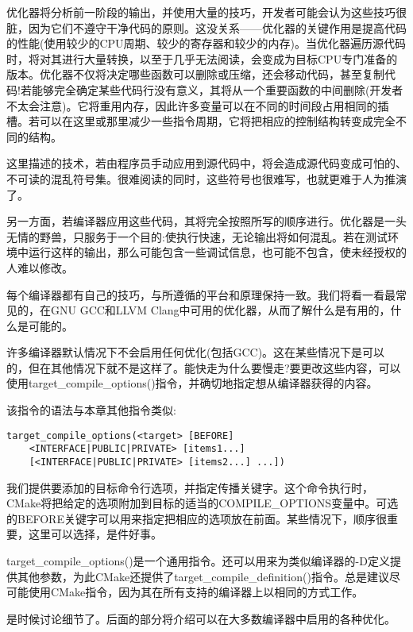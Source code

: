 
优化器将分析前一阶段的输出，并使用大量的技巧，开发者可能会认为这些技巧很脏，因为它们不遵守干净代码的原则。这没关系——优化器的关键作用是提高代码的性能(使用较少的CPU周期、较少的寄存器和较少的内存)。当优化器遍历源代码时，将对其进行大量转换，以至于几乎无法阅读，会变成为目标CPU专门准备的版本。优化器不仅将决定哪些函数可以删除或压缩，还会移动代码，甚至复制代码!若能够完全确定某些代码行没有意义，其将从一个重要函数的中间删除(开发者不太会注意)。它将重用内存，因此许多变量可以在不同的时间段占用相同的插槽。若可以在这里或那里减少一些指令周期，它将把相应的控制结构转变成完全不同的结构。

这里描述的技术，若由程序员手动应用到源代码中，将会造成源代码变成可怕的、不可读的混乱符号集。很难阅读的同时，这些符号也很难写，也就更难于人为推演了。

另一方面，若编译器应用这些代码，其将完全按照所写的顺序进行。优化器是一头无情的野兽，只服务于一个目的:使执行快速，无论输出将如何混乱。若在测试环境中运行这样的输出，那么可能包含一些调试信息，也可能不包含，使未经授权的人难以修改。

每个编译器都有自己的技巧，与所遵循的平台和原理保持一致。我们将看一看最常见的，在GNU GCC和LLVM Clang中可用的优化器，从而了解什么是有用的，什么是可能的。

许多编译器默认情况下不会启用任何优化(包括GCC)。这在某些情况下是可以的，但在其他情况下就不是这样了。能快走为什么要慢走?要更改这些内容，可以使用target\_compile\_options()指令，并确切地指定想从编译器获得的内容。

该指令的语法与本章其他指令类似:

\begin{lstlisting}[style=styleCMake]
target_compile_options(<target> [BEFORE]
	<INTERFACE|PUBLIC|PRIVATE> [items1...]
	[<INTERFACE|PUBLIC|PRIVATE> [items2...] ...])
\end{lstlisting}  

我们提供要添加的目标命令行选项，并指定传播关键字。这个命令执行时，CMake将把给定的选项附加到目标的适当的COMPILE\_OPTIONS变量中。可选的BEFORE关键字可以用来指定把相应的选项放在前面。某些情况下，顺序很重要，这里可以选择，是件好事。

\begin{tcolorbox}[colback=blue!5!white,colframe=blue!75!black,title=重要的Note]
target\_compile\_options()是一个通用指令。还可以用来为类似编译器的-D定义提供其他参数，为此CMake还提供了target\_compile\_definition()指令。总是建议尽可能使用CMake指令，因为其在所有支持的编译器上以相同的方式工作。
\end{tcolorbox}

是时候讨论细节了。后面的部分将介绍可以在大多数编译器中启用的各种优化。

